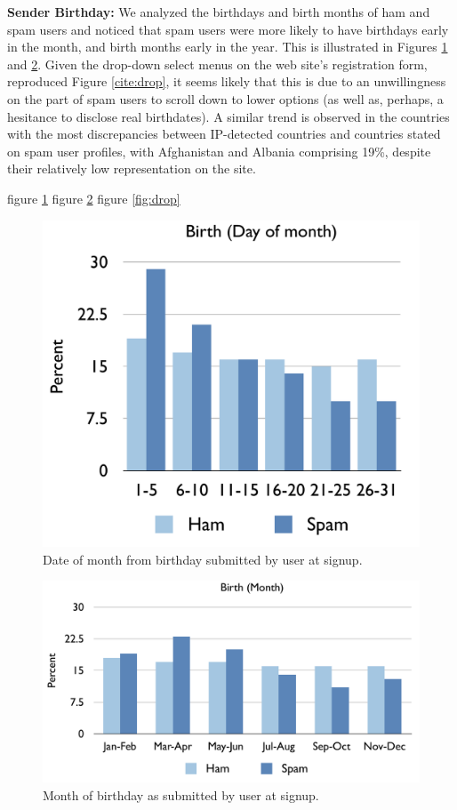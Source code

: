 \documentclass[preprint]{acm_proc_article-sp}
\begin{document}
\textbf{Sender Birthday:} We analyzed the birthdays and birth months of ham and spam users and noticed that spam users 
were more likely to have birthdays early in the month, and birth months early in the year. This is illustrated in 
Figures \ref{fig:day} and \ref{fig:month}. Given the drop-down select menus on the web site's registration form, reproduced 
Figure \ref{cite:drop}, it seems likely that this is due to an unwillingness on the part of spam users to 
scroll down to lower options (as well as, perhaps, a hesitance to disclose real birthdates). A similar trend is 
observed in the countries with the most discrepancies between IP-detected countries and countries stated on spam 
user profiles, with Afghanistan and Albania comprising 19\%, despite their relatively low representation on the 
site. 

figure \ref{fig:day}
figure \ref{fig:month}
figure \ref{fig:drop}
\begin{figure}[h]
    \centering
    \includegraphics[width=\linewidth]{figures/dob-day.pdf}
    \caption{Date of month from birthday submitted by user at signup.}
    \label{fig:day}
\end{figure}

\begin{figure}[h]
    \centering
    \includegraphics[width=\linewidth]{figures/dob-month.pdf}
    \caption{Month of birthday as submitted by user at signup.}
    \label{fig:month}
\end{figure}
\end{document}
